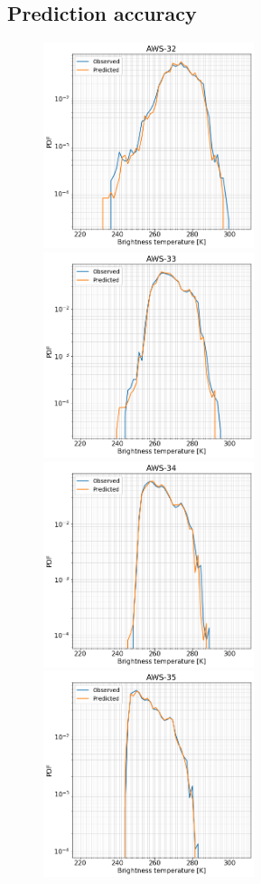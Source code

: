\documentclass[12pt]{article}
\begin{document}
\subsection{Prediction accuracy}
%
\begin{figure}[!p]
	\centering
	\includegraphics[height=60mm]{distribution_predicted_C32}\hspace{5mm}%
	\includegraphics[height=60mm]{distribution_predicted_C33}
	\includegraphics[height=60mm]{distribution_predicted_C34}\hspace{5mm}%
	\includegraphics[height=60mm]{distribution_predicted_C35}

\end{figure}
\end{document}
